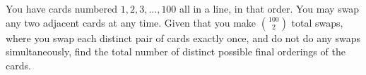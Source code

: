 You have cards numbered $1,2,3, ... ,100$ all in a line, in that order. You may swap any two adjacent cards at any time. Given that you make ${100 \choose 2}$ total swaps, where you swap each distinct pair of cards exactly once, and do not do any swaps simultaneously, find the total number of distinct possible final orderings of the cards.
